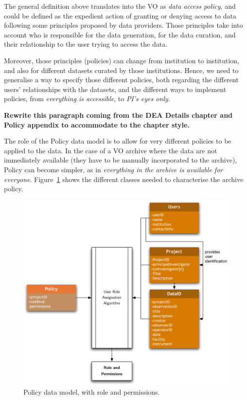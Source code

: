 		\noindent
		The general definition above translates into the VO as
		\emph{data access policy}, and could be defined as
		the expedient action of granting or denying access to
		data following some principles proposed by data
		providers. Those principles take into account who is
		responsible for the data generation, for the data curation,
		and their relationship to the user trying to access the
		data.
		
		Moreover, those principles (policies) can change from
		institution to institution, and also for different datasets
		curated by those institutions. Hence, we need to generalise
		a way to specify those different policies, both regarding
		the different users' relationships with the datasets, and
		the different ways to implement policies, from
		\emph{everything is accessible}, to \emph{PI's eyes only}.
		
		\invisiblenote
		{\textbf{Rewrite this paragraph coming from the DEA
			Details chapter and Policy appendix to accommodate
			to the chapter style.}}
			
		The role of the Policy data model is to allow for very
		different policies to be applied to the data. In the case
		of a VO archive where the data are not immediately
		available (they have to be manually incorporated to the
		archive), Policy can become simpler, as in \emph{everything
		in the archive is available for everyone}.
		Figure~\ref{figPolicyDataModel} shows the different classes
		needed to characterise the archive policy.
			
		\begin{figure}[tbp]
			\begin{center}
				\includegraphics[width=\columnwidth]
				{fig/Policy-DM}
			\end{center}
			\caption[Policy data model]
				{Policy data model, with role and permissions.}
			\label{figPolicyDataModel}
		\end{figure}
		
